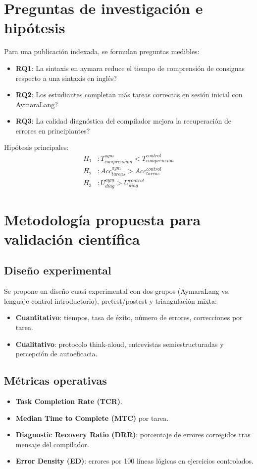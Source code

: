 \documentclass[11pt,a4paper]{article}
\begin{document}
\section{Preguntas de investigaci\'on e hip\'otesis}
Para una publicaci\'on indexada, se formulan preguntas medibles:
\begin{itemize}[leftmargin=*,itemsep=2pt]
  \item \textbf{RQ1}: \textquestiondown{}La sintaxis en aymara reduce el tiempo de comprensi\'on de consignas respecto a una sintaxis en ingl\'es?
  \item \textbf{RQ2}: \textquestiondown{}Los estudiantes completan m\'as tareas correctas en sesi\'on inicial con AymaraLang?
  \item \textbf{RQ3}: \textquestiondown{}La calidad diagn\'ostica del compilador mejora la recuperaci\'on de errores en principiantes?
\end{itemize}

Hip\'otesis principales:
\begin{align*}
H_1 &: T_{comprension}^{aym} < T_{comprension}^{control} \\
H_2 &: Acc_{tareas}^{aym} > Acc_{tareas}^{control} \\
H_3 &: U_{diag}^{aym} > U_{diag}^{control}
\end{align*}

\section{Metodolog\'ia propuesta para validaci\'on cient\'ifica}
\subsection{Dise\~no experimental}
Se propone un dise\~no cuasi experimental con dos grupos (AymaraLang vs. lenguaje control introductorio), pretest/postest y triangulaci\'on mixta:
\begin{itemize}[leftmargin=*,itemsep=2pt]
  \item \textbf{Cuantitativo}: tiempos, tasa de \'exito, n\'umero de errores, correcciones por tarea.
  \item \textbf{Cualitativo}: protocolo think-aloud, entrevistas semiestructuradas y percepci\'on de autoeficacia.
\end{itemize}

\subsection{M\'etricas operativas}
\begin{itemize}[leftmargin=*,itemsep=2pt]
  \item \textbf{Task Completion Rate (TCR)}.
  \item \textbf{Median Time to Complete (MTC)} por tarea.
  \item \textbf{Diagnostic Recovery Ratio (DRR)}: porcentaje de errores corregidos tras mensaje del compilador.
  \item \textbf{Error Density (ED)}: errores por 100 l\'ineas l\'ogicas en ejercicios controlados.
\end{itemize}
\end{document}
